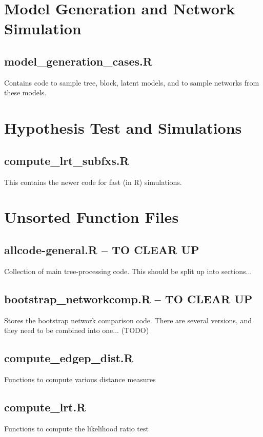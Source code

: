 \documentclass[11pt]{article}
\begin{document}
\section{Model Generation and Network Simulation}

\subsection{model\_generation\_cases.R}
Contains code to sample tree, block, latent models, and to sample networks from these models. 

\section{Hypothesis Test and Simulations}
\subsection{compute\_lrt\_subfxs.R}
This contains the newer code for fast (in R) simulations. 

\section{Unsorted Function Files}

\subsection{allcode-general.R -- TO CLEAR UP}
Collection of main tree-processing code. This should be split up into sections...

\subsection{bootstrap\_networkcomp.R -- TO CLEAR UP}
Stores the bootstrap network comparison code. There are several versions, and they need to be combined into one... (TODO)

\subsection{compute\_edgep\_dist.R}
Functions to compute various distance measures

\subsection{compute\_lrt.R}
Functions to compute the likelihood ratio test
\end{document}
